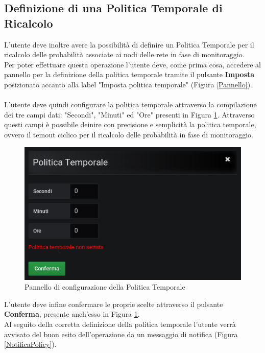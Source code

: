 \subsection{Definizione di una Politica Temporale di Ricalcolo}\label{policy}

L'utente deve inoltre avere la possibilità di definire un Politica Temporale per il ricalcolo delle probabilità associate ai nodi delle rete in fase di monitoraggio.\\
Per poter effettuare questa operazione l'utente deve, come prima cosa, accedere al pannello per la definizione della politica temporale tramite il pulsante \textbf{Imposta} posizionato accanto alla label "Imposta politica temporale" (Figura \ref{Pannello}).\\
~\\
L'utente deve quindi configurare la politica temporale attraverso la compilazione dei tre campi dati: "Secondi", "Minuti" ed "Ore" presenti in Figura \ref{PannelloPolicy}. Attraverso questi campi è possibile deinire con precisione e semplicità la politica temporale, ovvero il temout ciclico per il ricalcolo delle probabilità in fase di monitoraggio.

\begin{figure}[H]
	\begin{center}
		\includegraphics[scale=0.6]{./images/PannelloPolicy.png}
		 \caption{Pannello di configurazione della Politica Temporale}	
		 \label{PannelloPolicy}
	\end{center}
\end{figure} 

L'utente deve infine confermare le proprie scelte attraverso il pulsante \textbf{Conferma}, presente anch'esso in Figura \ref{PannelloPolicy}.
~\\
Al seguito della corretta definizione della politica temporale l'utente verrà avvisato del buon esito dell'operazione da un messaggio di notifica (Figura \ref{NotificaPolicy}). 

